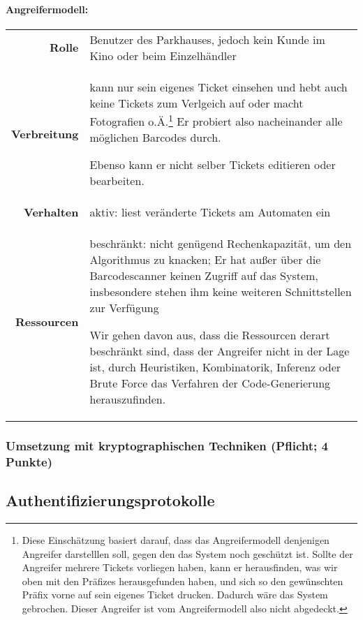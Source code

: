 \documentclass{article}
\begin{document}
\paragraph{Angreifermodell:}
\begin{center}
	\begin{savenotes}	%
		\begin{tabular}{rp{}}
			\textbf{Rolle}			&	Benutzer des Parkhauses, jedoch kein Kunde im Kino oder beim Einzelhändler	\\
			\textbf{Verbreitung}	&	kann nur sein eigenes Ticket einsehen und hebt auch keine Tickets zum Verlgeich auf oder macht Fotografien o.Ä.\footnote{
											Diese Einschätzung basiert darauf, dass das Angreifermodell denjenigen Angreifer darstelllen soll, gegen den das System noch geschützt ist.
											Sollte der Angreifer mehrere Tickets vorliegen haben, kann er herausfinden, was wir oben mit den Präfizes herausgefunden haben, und sich so den gewünschten Präfix vorne auf sein eigenes Ticket drucken.
											Dadurch wäre das System gebrochen.
											Dieser Angreifer ist vom Angreifermodell also nicht abgedeckt.
										}
										Er probiert also nacheinander alle möglichen Barcodes durch.
										
										Ebenso kann er nicht selber Tickets editieren oder bearbeiten.	\\
			\textbf{Verhalten}		&	aktiv: liest veränderte Tickets am Automaten ein	\\
			\textbf{Ressourcen}		&	beschränkt: nicht genügend Rechenkapazität, um den Algorithmus zu knacken;
										Er hat außer über die Barcodescanner keinen Zugriff auf das System, insbesondere stehen ihm keine weiteren Schnittstellen zur Verfügung
										
										Wir gehen davon aus, dass die Ressourcen derart beschränkt sind, dass der Angreifer nicht in der Lage ist, durch Heuristiken, Kombinatorik, Inferenz oder Brute Force das Verfahren der Code-Generierung herauszufinden.
		\end{tabular}
	\end{savenotes}
\end{center}
\subsubsection{Umsetzung mit kryptographischen Techniken (Pflicht; 4 Punkte)}


\subsection{Authentifizierungsprotokolle}
\end{document}
